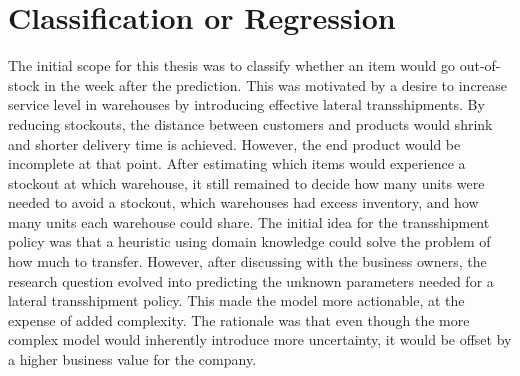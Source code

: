\documentclass[../../main.tex]{subfiles}
\begin{document}

\section{Classification or Regression}
The initial scope for this thesis was to classify whether an item would go out-of-stock in the week after the prediction. This was motivated by a desire to increase service level in warehouses by introducing effective lateral transshipments. By reducing stockouts, the distance between customers and products would shrink and shorter delivery time is achieved. However, the end product would be incomplete at that point. After estimating which items would experience a stockout at which warehouse, it still remained to decide how many units were needed to avoid a stockout, which warehouses had excess inventory, and how many units each warehouse could share. The initial idea for the transshipment policy was that a heuristic using domain knowledge could solve the problem of how much to transfer. However, after discussing with the business owners, the research question evolved into predicting the unknown parameters needed for a lateral transshipment policy. This made the model more actionable, at the expense of added complexity. The rationale was that even though the more complex model would inherently introduce more uncertainty, it would be offset by a higher business value for the company.

\end{document}
